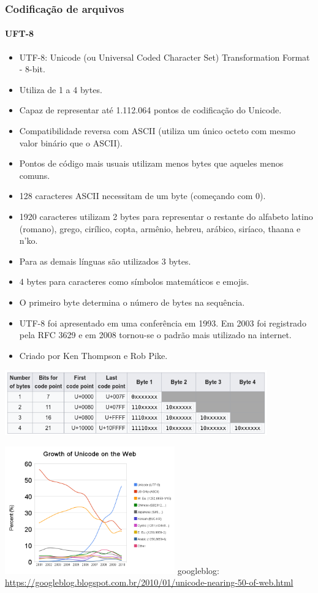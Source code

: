 \begin{frame}[allowframebreaks]
\frametitle{Codificação de arquivos}
\framesubtitle{UFT-8}
  \begin{itemize}
  \item UTF-8: Unicode (ou Universal Coded Character Set) Transformation Format - 8-bit.
  \item Utiliza de 1 a 4 bytes.
  \item Capaz de representar até 1.112.064 pontos de codificação do Unicode.
  \item Compatibilidade reversa com ASCII (utiliza um único octeto com mesmo valor binário que o ASCII).
  \item Pontos de código mais usuais utilizam menos bytes que aqueles menos comuns.
  \item 128 caracteres ASCII necessitam de um byte (começando com 0). 
  \item 1920 caracteres utilizam 2 bytes para representar o restante do alfabeto latino (romano),
        grego, cirílico, copta, armênio, hebreu, arábico, siríaco, thaana e n'ko.
  \item Para as demais línguas são utilizados 3 bytes.
  \item 4 bytes para caracteres como símbolos matemáticos e emojis.
  \item O primeiro byte determina o número de bytes na sequência.
  \item UTF-8 foi apresentado em uma conferência em 1993. Em 2003 foi registrado pela RFC 3629 e 
        em 2008 tornou-se o padrão mais utilizado na internet.
  \item Criado por Ken Thompson e Rob Pike.
  \end{itemize}

  \includegraphics[width=0.85\textwidth]{figures/utf8bytes.png}

  {
  \centering
  \includegraphics[width=0.55\textwidth]{figures/unicodeweb.png} 
  }
  \footnotesize{googleblog: \url{https://googleblog.blogspot.com.br/2010/01/unicode-nearing-50-of-web.html}}
  


\end{frame}
